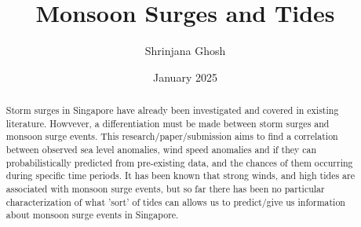 \documentclass{article}
\begin{document}
\title{Monsoon Surges and Tides}
\author{Shrinjana Ghosh}
\date{January 2025}
\vfill





\maketitle

\begin{abstract}
    Storm surges in Singapore have already been investigated and covered in existing literature. Howvever, a differentiation must be made
    between storm surges and monsoon surge events. This research/paper/submission aims to find a correlation between observed sea level anomalies, wind speed anomalies
    and if they can probabilistically predicted from pre-existing data, and the chances of them occurring during specific time periods. It has been known that strong winds, and high tides are associated with monsoon surge events, but so far there has been no particular characterization of what 'sort' of tides can allows us to predict/give us information about monsoon surge events in Singapore. 
\end{abstract}
\end{document}
